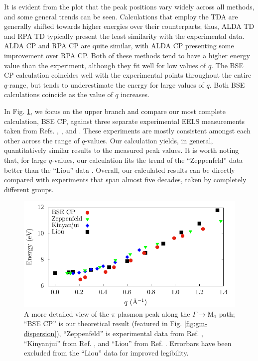 \documentclass[aps,prb,10pt,showpacs,superscriptaddress,twocolumn,notitlepage]{revtex4-1}
\begin{document}
It is evident from the plot that the peak positions vary widely across all
methods, and some general trends can be seen. Calculations that employ the TDA
are generally shifted towards higher energies over their counterparts; thus,
ALDA TD and RPA TD typically present the least similarity with the experimental
data. ALDA CP and RPA CP are quite similar, with ALDA CP presenting some
improvement over RPA CP. Both of these methods tend to have a higher energy
value than the experiment, although they fit well for low values of $q$. The BSE
CP calculation coincides well with the experimental points throughout the entire
$q$-range, but tends to underestimate the energy for large values of $q$. Both
BSE calculations coincide as the value of $q$ increases.

In Fig. \ref{fig:gm-dispersion2}, we focus on the upper branch and compare our
most complete calculation, BSE CP, against three separate experimental EELS
measurements taken from Refs. ,
, and . These experiments are
mostly consistent amongst each other across the range of $q$-values. Our
calculation yields, in general, quantitatively similar results to the measured
peak values. It is worth noting that, for large $q$-values, our calculation fits
the trend of the ``Zeppenfeld'' data \cite{zeppenfeldZP71} better than the
``Liou'' data \cite{liouPRB15}. Overall, our calculated results can be directly
compared with experiments that span almost five decades, taken by completely
different groups.

\begin{figure}[b]
\includegraphics[width=\linewidth]{fig05}
\caption{A more detailed view of the $\pi$ plasmon peak along the $\Gamma
\rightarrow \mathrm{M}_{1}$ path; ``BSE CP'' is our theoretical result (featured
in Fig. \ref{fig:gm-dispersion}), ``Zeppenfeld'' is experimental data from Ref.
, ``Kinyanjui'' from Ref.
, and ``Liou'' from Ref. .
Errorbars have been excluded from the ``Liou'' data for improved legibility.}
\label{fig:gm-dispersion2}
\end{figure}
\end{document}
